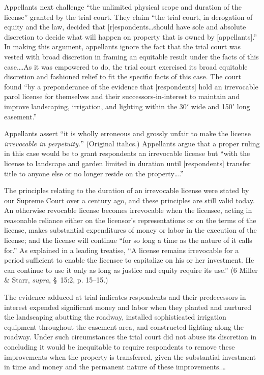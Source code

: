 Appellants next challenge ``the unlimited physical scope and duration of the
license'' granted by the trial court. They claim ``the trial court, in
derogation of equity and the law, decided that [r]espondents\ldots should have
sole and absolute discretion to decide what will happen on property that is
owned by [appellants].'' In making this argument, appellants ignore the fact
that the trial court was vested with broad discretion in framing an equitable
result under the facts of this case.\ldots As it was empowered to do, the trial
court exercised its broad equitable discretion and fashioned relief to fit the
specific facts of this case. The court found ``by a preponderance of the
evidence that [respondents] hold an irrevocable parol license for themselves and
their successors-in-interest to maintain and improve landscaping, irrigation,
and lighting within the 30$'$ wide and 150$'$ long easement.''

Appellants assert ``it is wholly erroneous and grossly unfair to make the
license \textit{irrevocable in perpetuity.}'' (Original italics.) Appellants
argue that a proper ruling in this case would be to grant respondents an
irrevocable license but ``with the license to landscape and garden limited in
duration until [respondents] transfer title to anyone else or no longer reside
on the property\ldots.''

The principles relating to the duration of an irrevocable license were stated by
our Supreme Court over a century ago, and these principles are still valid
today. An otherwise revocable license becomes irrevocable when the licensee,
acting in reasonable reliance either on the licensor's representations or on the
terms of the license, makes substantial expenditures of money or labor in the
execution of the license; and the license will continue ``for so long a time as
the nature of it calls for.'' As explained in a leading treatise, ``A license
remains irrevocable for a period sufficient to enable the licensee to capitalize
on his or her investment. He can continue to use it only as long as justice and
equity require its use.'' (6 Miller \& Starr, \textit{supra},  \S~15:2, p.
15--15.)

The evidence adduced at trial indicates respondents and their predecessors in
interest expended significant money and labor when they planted and nurtured the
landscaping abutting the roadway, installed sophisticated irrigation equipment
throughout the easement area, and constructed lighting along the roadway. Under
such circumstances the trial court did not abuse its discretion in concluding it
would be inequitable to require respondents to remove these improvements when
the property is transferred, given the substantial investment in time and money
and the permanent nature of these improvements.\dots

